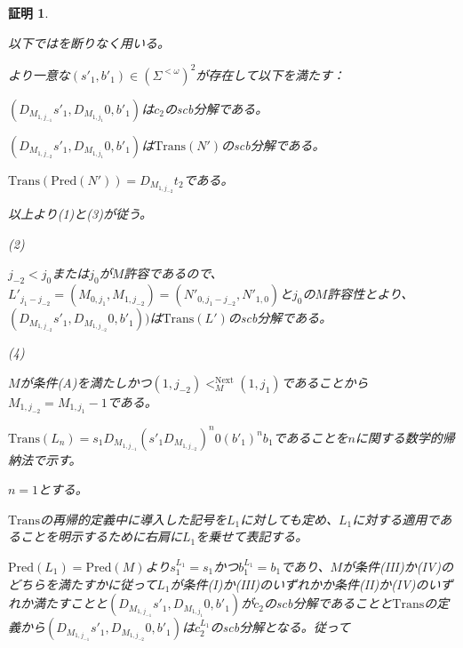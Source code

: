 \documentclass[dvipdfmx,uplatex]{jsarticle}
\theoremstyle{customnonumberbreakfortheorem}
\theoremstyle{customnonumberbreakforproof}
\newtheorem{hideableproof}{証明}
\begin{document}
\begin{hideableproof}
	\begin{indented}
		\item 以下ではを断りなく用いる。
		\item {}より一意な\((s'_1,b'_1) \in (\Sigma^{< \omega})^2\)が存在して以下を満たす：
		\begin{penumerate}
			\item \((D_{M_{1,j_{-1}}} s'_1,D_{M_{1,j_1}} 0,b'_1)\)は\(c_2\)のscb分解である。
			\item \((D_{M_{1,j_{-2}}} s'_1,D_{M_{1,j_1}} 0,b'_1)\)は\(\textrm{Trans}(N')\)のscb分解である。
			\item \(\textrm{Trans}(\textrm{Pred}(N')) = D_{M_{1,j_{-2}}} t_2\)である。
		\end{penumerate}
		\item 以上より(1)と(3)が従う。
		\item
		\item (2)
		\item \(j_{-2} < j_0\)または\(j_0\)が\(M\)許容であるので、\(L'_{j_1-j_{-2}} = (M_{0,j_1},M_{1,j_{-2}}) = (N'_{0,j_1-j_{-2}},N'_{1,0})\)と\(j_0\)の\(M\)許容性とより、\((D_{M_{1,j_{-2}}} s'_1,D_{M_{1,j_{-2}}} 0,b'_1))\)は\(\textrm{Trans}(L')\)のscb分解である。
		\item
		\item (4)
		\item \(M\)が条件(A)を満たしかつ\((1,j_{-2}) <_M^{\textrm{Next}} (1,j_1)\)であることから\(M_{1,j_{-2}} = M_{1,j_1}-1\)である。
		\item \(\textrm{Trans}(L_n) = s_1 D_{M_{1,j_{-1}}} (s'_1 D_{M_{1,j_{-2}}})^n 0 (b'_1)^n b_1\)であることを\(n\)に関する数学的帰納法で示す。
		\item \(n = 1\)とする。
		\begin{indented}
			\item \(\textrm{Trans}\)の再帰的定義中に導入した記号を\(L_1\)に対しても定め、\(L_1\)に対する適用であることを明示するために右肩に\(L_1\)を乗せて表記する。
			\item \(\textrm{Pred}(L_1) = \textrm{Pred}(M)\)より\(s_1^{L_1} = s_1\)かつ\(b_1^{L_1} = b_1\)であり、\(M\)が条件(III)か(IV)のどちらを満たすかに従って\(L_1\)が条件(I)か(III)のいずれかか条件(II)か(IV)のいずれか満たすことと\((D_{M_{1,j_{-1}}} s'_1,D_{M_{1,j_1}} 0,b'_1)\)が\(c_2\)のscb分解であることと\(\textrm{Trans}\)の定義から\((D_{M_{1,j_{-1}}} s'_1,D_{M_{1,j_{-2}}} 0,b'_1)\)は\(c_2^{L_1}\)のscb分解となる。従って

\end{indented}
\end{indented}
\end{hideableproof}
\end{document}
